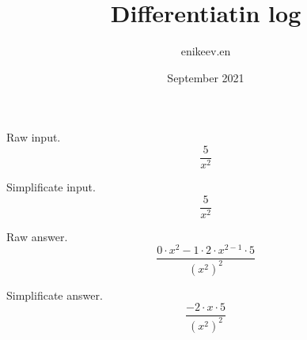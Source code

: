 \documentclass{article}
\title{Differentiatin log}
\author{enikeev.en}
\date{September 2021}
\begin{document}
\Large \center
	Raw input.
\[\frac{5}{x^{2}}\]

\Large \center
	Simplificate input.
\[\frac{5}{x^{2}}\]

\Large \center
	Raw answer.
\[\frac{0\cdot x^{2} - 1\cdot 2\cdot x^{2 - 1}\cdot 5}{(x^{2})^{2}}\]

\Large \center
	Simplificate answer.
\[\frac{ - 2\cdot x\cdot 5}{(x^{2})^{2}}\]
\end{document}
